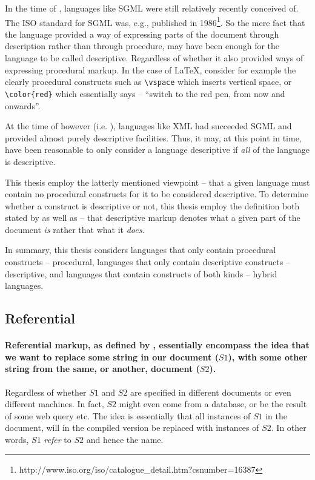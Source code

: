 \documentclass{scrreprt}
\begin{document}
In the time of \citet{coombs}, languages like SGML were still relatively recently conceived of. The ISO standard for SGML was, e.g., published in 1986\footnote{http://www.iso.org/iso/catalogue\_detail.htm?csnumber=16387}. So the mere fact that the language provided a way of expressing parts of the document through description rather than through procedure, may have been enough for the language to be called descriptive. Regardless of whether it also provided ways of expressing procedural markup. In the case of \LaTeX{}, consider for example the clearly procedural constructs such as \texttt{\textbackslash vspace} which inserts vertical space, or  \texttt{\textbackslash color\{red\}} which essentially says -- ``switch to the red pen, from now and onwards''.

At the time of \citet{bray} however (i.e. \citeyear{bray}), languages like XML had succeeded SGML and provided almost purely descriptive facilities. Thus, it may, at this point in time, have been reasonable to only consider a language descriptive if \emph{all} of the language is descriptive.

This thesis employ the latterly mentioned viewpoint -- that a given language must contain no procedural constructs for it to be considered descriptive. To determine whether a construct is descriptive or not, this thesis employ the definition both stated by \citet{coombs} as well as \citet{bray} -- that descriptive markup denotes what a given part of the document \emph{is} rather that what it \emph{does}.

In summary, this thesis considers languages that only contain procedural constructs -- procedural, languages that only contain descriptive constructs -- descriptive, and languages that contain constructs of both kinds -- hybrid languages.  


\subsection{Referential}
\label{sec:referential-markup}
\paragraph{Referential markup, as defined by \citet{coombs}, essentially encompass the idea that we want to replace some string in our document ($S1$), with some other string from the same, or another, document ($S2$).} Regardless of whether $S1$ and $S2$ are specified in different documents or even different machines. In fact, $S2$ might even come from a database, or be the result of some web query etc. The idea is essentially that all instances of $S1$ in the document, will in the compiled version be replaced with instances of $S2$. In other words, $S1$ \emph{refer} to $S2$ and hence the name.
\end{document}
